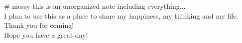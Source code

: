 # messy
this is an unorganized note including everything...\\
I plan to use this as a place to share my happiness, my thinking and my life.\\
Thank you for coming!\\
Hope you have a great day!
